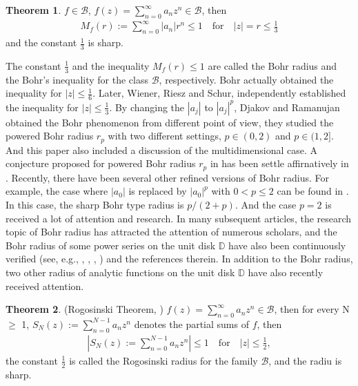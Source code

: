 \documentclass{birkjour}
\theoremstyle{plain}
\theoremstyle{definition}
\theoremstyle{definition}
\newtheorem{theorem}{Theorem}
\begin{document}
\begin{theorem}\cite{ref9}
	$\mathit{f} \in \mathcal{B}$,
	$f(z)=\sum_{n=0}^{\infty}a_{n}z^{n} \in \mathcal{B}$, then
	\begin{align*}
		\mathit{M}_{f} (r):=\sum_{n=0}^{\infty} \left| a_{n} \right| r^{n} \le 1 \quad
		\text{for} \quad \left| z \right|=r\le \frac{1}{3}
	\end{align*}
and the constant $\frac{1}{3}$ is sharp.
\end{theorem}
\par
The constant $\frac{1}{3}$ and the inequality $\mathit{M}_{f} (r) \le 1$ are called the Bohr radius and the Bohr's inequality for the class $\mathcal{B}$, respectively.
Bohr actually obtained the inequality for $\left| z \right| \le \frac{1}{6}$.
Later, Wiener, Riesz and Schur, independently established the inequality for $\left| z \right| \le \frac{1}{3}$.
By changing the $\left| a_j \right|$ to $\left| a_j \right|^p$, Djakov and Ramanujan \cite{ref18} obtained the Bohr phenomenon from different point of view, they studied the powered Bohr radius $r_p$ with two different settings, $p \in (0,2)$ and $p \in (1,2]$. And this paper also included a discussion of the multidimensional case. A conjecture proposed for powered Bohr radius $r_p$ in \cite{ref18} has been settle affirnatively in \cite{ref29}. Recently, there have been several other refined versions of Bohr radius. For example, the case where $|a_0|$ is replaced by $|a_0|^p$ with $0 < p \leq 2$ can be found in \cite{ref33,ref36}. In this case, the sharp Bohr type radius is $p/(2+p)$. And the case $p=2$ is received a lot of attention and research. In many subsequent articles, the research topic of Bohr radius has attracted the attention of numerous scholars, and the Bohr radius of some power series on the unit disk $\mathbb{D}$ have also been continuously verified (see, e.g.\cite{ref1}, \cite{ref2}, \cite{ref5} \cite{ref7}, \cite{ref20}, \cite{ref27}) and the references therein.
In addition to the Bohr radius, two other radius of analytic functions on the unit disk $\mathbb{D}$ have also recently received attention.


\begin{theorem}(Rogosinski Theorem, \cite{ref37})
	$\mathit{f}(z)=\sum_{n=0}^{\infty}a_{n}z^{n}  \in \mathcal{B}$, then for every N $\ge$ 1, $\mathit{S}_{N} (z):=\sum_{n=0}^{N-1} a_{n} z^{n} $ denotes the partial sums of $\mathit{f}$, then
		\begin{align*}
		\left |\mathit{S}_{N} (z):=\sum_{n=0}^{N-1} a_{n} z^{n} \right | \le 1\quad
		\text{for}\quad \left| z \right| \le \frac{1}{2},
	\end{align*}
	the constant $\frac{1}{2}$ is called the Rogosinski radius for the family $\mathcal{B}$, and the radiu is sharp.
\end{theorem}
\end{document}
